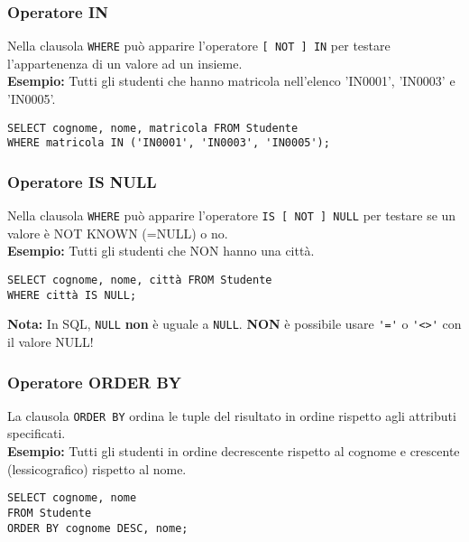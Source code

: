 \documentclass[a4paper, 10pt, titlepage]{article}
\begin{document}
	\subsubsection{Operatore IN}
		Nella clausola \lstinline|WHERE| può apparire l’operatore \lstinline|[ NOT ] IN| per testare
		l’appartenenza di un valore ad un insieme. \medskip \\
		\textbf{Esempio: }Tutti gli studenti che hanno matricola nell’elenco 'IN0001', 'IN0003' e
		'IN0005'.
		\begin{lstlisting}
SELECT cognome, nome, matricola FROM Studente
WHERE matricola IN ('IN0001', 'IN0003', 'IN0005');
		\end{lstlisting}
	
	\subsubsection{Operatore IS NULL}
		Nella clausola \lstinline|WHERE| può apparire l’operatore \lstinline|IS [ NOT ] NULL| per testare
		se un valore è NOT KNOWN (=NULL) o no. \medskip \\
		\textbf{Esempio: }Tutti gli studenti che NON hanno una città.
\begin{lstlisting}
SELECT cognome, nome, città FROM Studente
WHERE città IS NULL;
\end{lstlisting}
	\textbf{Nota: }In SQL, \lstinline|NULL| \textbf{non} è uguale a \lstinline|NULL|.
	\textbf{NON} è possibile usare \lstinline|'='| o \lstinline|'<>'| con il valore NULL!
	
	\subsubsection{Operatore ORDER BY}
		La clausola \lstinline|ORDER BY| ordina le tuple del risultato in ordine rispetto agli
		attributi specificati. \medskip \\
		\textbf{Esempio: }Tutti gli studenti in ordine decrescente rispetto al cognome e crescente
		(lessicografico) rispetto al nome.
		\begin{lstlisting}
SELECT cognome, nome
FROM Studente
ORDER BY cognome DESC, nome;
		\end{lstlisting}
		
\end{document}
